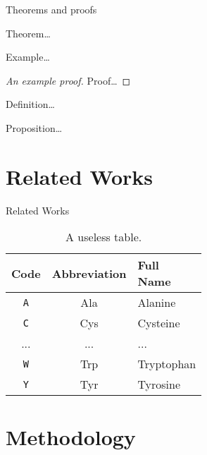 \documentclass[
  xcolor={hyperref,svgnames,x11names,table},
  hyperref={pdfencoding=unicode,plainpages=false,pdfpagelabels=true,breaklinks=true},
  brazilian,english,12pt,aspectratio=149,
]{beamer}
\begin{document}
\begin{frame}{Theorems and proofs}
  \pause
  \begin{theorem}
    Theorem\dots
  \end{theorem}

  \pause
  \begin{example}
    Example\dots
  \end{example}

  \pause
  \begin{proof}[An example proof]
    Proof\dots
  \end{proof}

  \pause
  \begin{definition}
    Definition\dots
  \end{definition}

  \pause
  \begin{proposition}
    Proposition\dots
  \end{proposition}
\end{frame}

\section{Related Works}

\begin{frame}{Related Works}

  \begin{table}[H] %
    \centering
    \begin{tabular}{ccl}
      \toprule
      Code      & Abbreviation  & \makecell{Full\\Name} \\
      \midrule
      \texttt{A}  & Ala          & Alanine \\
      \texttt{C}  & Cys          & Cysteine \\
      ...         & ...          & ... \\
      \texttt{W}  & Trp          & Tryptophan \\
      \texttt{Y}  & Tyr          & Tyrosine \\
      \bottomrule
    \end{tabular}
    \caption{A useless table.}
  \end{table}

\end{frame}

\section{Methodology}
\end{document}
